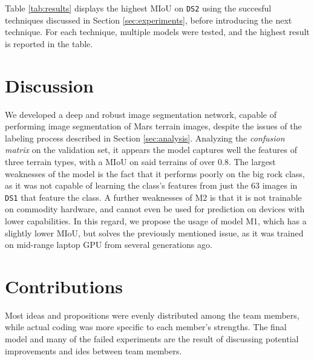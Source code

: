 \documentclass[11pt]{article}
\begin{document}
\begin{multicols}{2}
      Table \ref{tab:results} displays the highest MIoU on \texttt{DS2} using the succesful techniques discussed in Section \ref{sec:experiments}, before introducing the next technique. For each technique, multiple models were tested, and the highest result is reported in the table.

      \section{Discussion}

      We developed a deep and robust image segmentation network, capable of performing image segmentation of Mars terrain images, despite the issues of the labeling process described in Section \ref{sec:analysis}. Analyzing the \textit{confusion matrix} on the validation set, it appears the model captures well the features of three terrain types, with a MIoU on said terrains of over $0.8$. The largest weaknesses of the model is the fact that it performs poorly on the big rock class, as it was not capable of learning the class's features from just the $63$ images in \texttt{DS1} that feature the class. A further weaknesses of M2 is that it is not trainable on commodity hardware, and cannot even be used for prediction on devices with lower capabilities. In this regard, we propose the usage of model M1, which has a slightly lower MIoU, but solves the previously mentioned issue, as it was trained on mid-range laptop GPU from several generations ago.

      \section{Contributions}

      Most ideas and propositions were evenly distributed among the team members, while actual coding was more specific to each member's strengths. The final model and many of the failed experiments are the result of discussing potential improvements and ides between team members.


\end{multicols}
\end{document}
